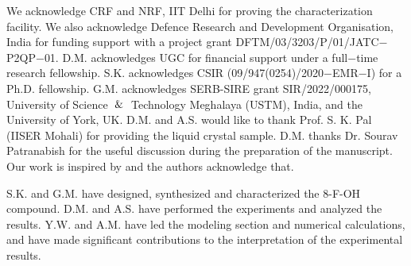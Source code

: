 \documentclass[reprint,amsfonts,amsmath,amssymb,aps,pre,floatfix,10pt]{revtex4-1}
\begin{document}
\begin{acknowledgements}
We acknowledge CRF and NRF, IIT Delhi for proving the characterization facility. We also acknowledge Defence Research and Development Organisation, India for funding support with a project grant DFTM/03/3203/P/01/JATC$-$P2QP$-$01.   D.M. acknowledges UGC for financial support under a full$-$time research fellowship. S.K. acknowledges CSIR (09/947(0254)/2020$-$EMR$-$I) for a Ph.D. fellowship. G.M. acknowledges SERB-SIRE grant SIR/2022/000175, University of Science $\And$ Technology Meghalaya (USTM), India, and the University of York, UK. D.M. and A.S. would like to thank Prof. S. K. Pal (IISER Mohali) for providing the liquid crystal sample. D.M. thanks Dr. Sourav Patranabish for the useful discussion during the preparation of the manuscript. Our work is inspired by \cite{patranabish2021quantum_38} and the authors acknowledge that.


S.K. and G.M. have designed, synthesized and characterized the 8-F-OH compound. D.M. and A.S. have performed the experiments and analyzed the results. Y.W. and A.M. have led the modeling section and numerical calculations, and have made significant contributions to the interpretation of the experimental results.

\end{acknowledgements}



\end{document}
